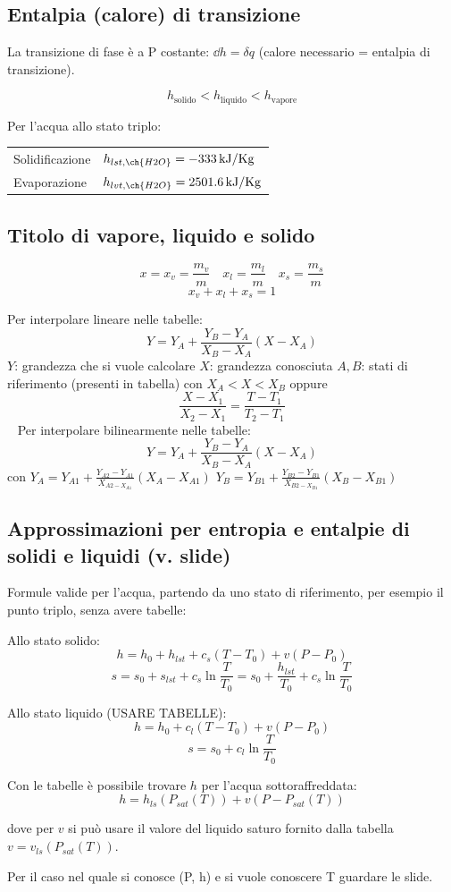 \subsection{Entalpia (calore) di transizione}
La transizione di fase è a P costante: $\dd{h} = \delta q$ (calore necessario = entalpia di transizione).

\[ h_\text{solido} < h_\text{liquido} < h_\text{vapore} \]

Per l'acqua allo stato triplo:
\begin{tabular}{ll}
    Solidificazione & $h_{lst,\ch{H2O}} = \SI{-333}{kJ/Kg}$ \\
    Evaporazione & $h_{lvt,\ch{H2O}} = \SI{2501.6}{kJ/Kg}$
\end{tabular}

\subsection{Titolo di vapore, liquido e solido}
\[ x = x_v = \frac{m_v}{m} \quad x_l = \frac{m_l}{m} \quad x_s = \frac{m_s}{m} \]
\[ x_v + x_l + x_s = 1 \]

Per interpolare lineare nelle tabelle:
\[ Y = Y_A + \frac{Y_B-Y_A}{X_B-X_A}(X-X_A) \]
$Y$: grandezza che si vuole calcolare \newline
$X$: grandezza conosciuta \newline
$A, B$: stati di riferimento (presenti in tabella) con $X_A < X < X_B$ \newline
oppure
\[ \frac{X-X_1}{X_2-X_1} = \frac{T-T_1}{T_2-T_1} \]
\ \newline \newline
Per interpolare bilinearmente nelle tabelle:
\[ Y = Y_A + \frac{Y_B-Y_A}{X_B-X_A}(X-X_A) \]
con
$Y_A = Y_{A1} + \frac{Y_{A2} - Y_{A1}}{X_{A2 - X_{A1}}}(X_A-X_{A1})$
$Y_B = Y_{B1} + \frac{Y_{B2} - Y_{B1}}{X_{B2 - X_{B1}}}(X_B-X_{B1})$

\subsection{Approssimazioni per entropia e entalpie di solidi e liquidi (v. slide)}

Formule valide per l'acqua, partendo da uno stato di riferimento, per esempio il punto triplo, senza avere tabelle:

Allo stato solido:
\[ h = h_0 + h_{lst} + c_s(T-T_0) + v(P-P_0) \]
\[ s = s_0 + s_{lst} + c_s\ln{\frac{T}{T_0}} = s_0 + \frac{h_{lst}}{T_0} + c_s\ln{\frac{T}{T_0}} \]

Allo stato liquido (USARE TABELLE):
\[ h = h_0 + c_l(T-T_0) + v(P-P_0) \]
\[ s = s_0 + c_l\ln{\frac{T}{T_0}} \]

Con le tabelle è possibile trovare $h$ per l'acqua sottoraffreddata:
\[ h = h_{ls}(P_{sat}(T)) + v(P-P_{sat}(T)) \]

dove per $v$ si può usare il valore del liquido saturo fornito dalla tabella $v = v_{ls}(P_{sat}(T))$.

Per il caso nel quale si conosce (P, h) e si vuole conoscere T guardare le slide.
